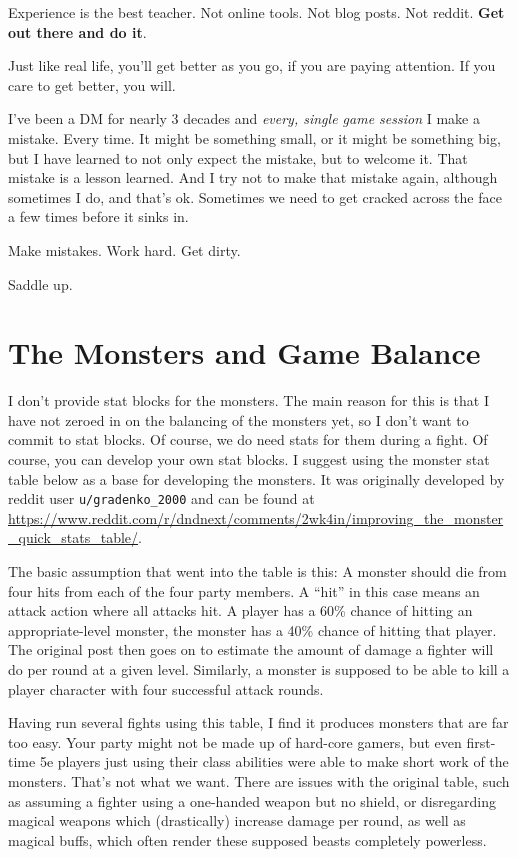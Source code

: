 Experience is the best teacher. Not online tools. Not blog posts. Not reddit. \textbf{Get out there and do it}.

Just like real life, you'll get better as you go, if you are paying attention. If you care to get better, you will.

I've been a DM for nearly 3 decades and \emph{every, single game session} I make a mistake. Every time. It might be something small, or it might be something big, but I have learned to not only expect the mistake, but to welcome it. That mistake is a lesson learned. And I try not to make that mistake again, although sometimes I do, and that's ok. Sometimes we need to get cracked across the face a few times before it sinks in.

Make mistakes. Work hard. Get dirty.

Saddle up.

\chapter{The Monsters and Game Balance}
I don't provide stat blocks for the monsters. The main reason for this is that I have not zeroed in on the balancing of the monsters yet, so I don't want to commit to stat blocks. Of course, we do need stats for them during a fight. Of course, you can develop your own stat blocks. I suggest using the monster stat table below as a base for developing the monsters. It was originally developed by reddit user \texttt{u/gradenko\_2000} and can be found at \url{https://www.reddit.com/r/dndnext/comments/2wk4in/improving_the_monster_quick_stats_table/}.

The basic assumption that went into the table is this: A monster should die from four hits from each of the four party members. A ``hit'' in this case means an attack action where all attacks hit. A player has a 60\% chance of hitting an appropriate-level monster, the monster has a 40\% chance of hitting that player. The original post then goes on to estimate the amount of damage a fighter will do per round at a given level. Similarly, a monster is supposed to be able to kill a player character with four successful attack rounds.

Having run several fights using this table, I find it produces monsters that are far too easy. Your party might not be made up of hard-core gamers, but even first-time 5e players just using their class abilities were able to make short work of the monsters. That's not what we want. There are issues with the original table, such as assuming a fighter using a one-handed weapon but no shield, or disregarding magical weapons which (drastically) increase damage per round, as well as magical buffs, which often render these supposed beasts completely powerless.

